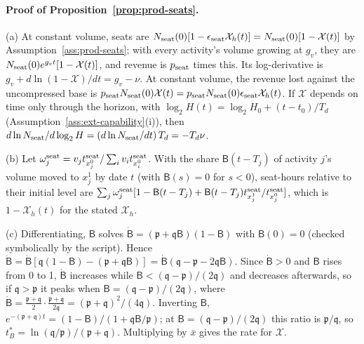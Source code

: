 \paragraph{Proof of Proposition~\ref{prop:prod-seats}.}
(a) At constant volume, seats are $N_{\rm seat}(0)[1-\epsilon_{\rm seat}\mathcal X_h(t)]=N_{\rm seat}(0)[1-\mathcal X(t)]$ by Assumption~\ref{ass:prod-seats}; with every activity's volume growing at $g_v$, they are $N_{\rm seat}(0)e^{g_vt}[1-\mathcal X(t)]$, and revenue is $p_{\rm seat}$ times this. Its log-derivative is $g_v+d\ln(1-\mathcal X)/dt=g_v-\nu$. At constant volume, the revenue lost against the uncompressed base is $p_{\rm seat}N_{\rm seat}(0)\mathcal X(t)=p_{\rm seat}N_{\rm seat}(0)\epsilon_{\rm seat}\mathcal X_h(t)$. If $\mathcal X$ depends on time only through the horizon, with $\log_2H(t)=\log_2H_0+(t-t_0)/T_d$ (Assumption~\ref{ass:ext-capability}(i)), then $d\ln N_{\rm seat}/d\log_2H=(d\ln N_{\rm seat}/dt)\,T_d=-T_d\nu$.

(b) Let $\omega^{\rm seat}_j=v_jt^{\rm seat}_{x^0_j}/\sum_iv_it^{\rm seat}_{x^0_i}$. With the share $\mathsf B(t-T_j)$ of activity $j$'s volume moved to $x^1_j$ by date $t$ (with $\mathsf B(s)=0$ for $s<0$), seat-hours relative to their initial level are $\sum_j\omega^{\rm seat}_j[1-\mathsf B(t-T_j)+\mathsf B(t-T_j)t^{\rm seat}_{x^1_j}/t^{\rm seat}_{x^0_j}]$, which is $1-\mathcal X_h(t)$ for the stated $\mathcal X_h$.

(c) Differentiating, $\mathsf B$ solves $\dot{\mathsf B}=(\mathfrak p+\mathfrak q\mathsf B)(1-\mathsf B)$ with $\mathsf B(0)=0$ (checked symbolically by the script). Hence $\ddot{\mathsf B}=\dot{\mathsf B}[\mathfrak q(1-\mathsf B)-(\mathfrak p+\mathfrak q\mathsf B)]=\dot{\mathsf B}(\mathfrak q-\mathfrak p-2\mathfrak q\mathsf B)$. Since $\dot{\mathsf B}>0$ and $\mathsf B$ rises from 0 to 1, $\dot{\mathsf B}$ increases while $\mathsf B<(\mathfrak q-\mathfrak p)/(2\mathfrak q)$ and decreases afterwards, so if $\mathfrak q>\mathfrak p$ it peaks when $\mathsf B=(\mathfrak q-\mathfrak p)/(2\mathfrak q)$, where $\dot{\mathsf B}=\tfrac{\mathfrak p+\mathfrak q}{2}\cdot\tfrac{\mathfrak p+\mathfrak q}{2\mathfrak q}=(\mathfrak p+\mathfrak q)^2/(4\mathfrak q)$. Inverting $\mathsf B$, $e^{-(\mathfrak p+\mathfrak q)t}=(1-\mathsf B)/(1+\mathfrak q\mathsf B/\mathfrak p)$; at $\mathsf B=(\mathfrak q-\mathfrak p)/(2\mathfrak q)$ this ratio is $\mathfrak p/\mathfrak q$, so $t^*_B=\ln(\mathfrak q/\mathfrak p)/(\mathfrak p+\mathfrak q)$. Multiplying by $\bar x$ gives the rate for $\mathcal X$.

